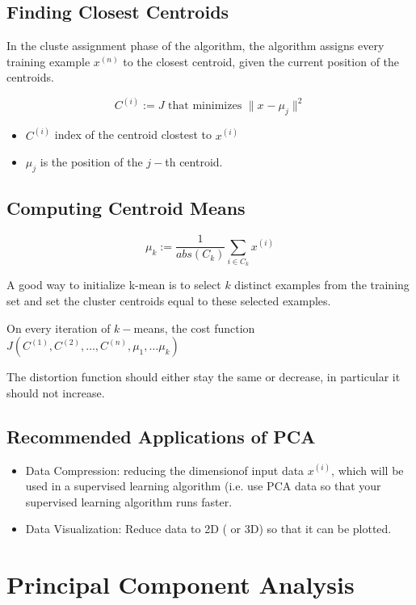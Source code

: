 \documentclass[11pt]{article} %
\begin{document}
\subsection*{Finding Closest Centroids}

In the cluste assignment phase of the algorithm, the algorithm assigns every training example $x^{(n)}$ to the closest 
centroid, given the current position of the centroids.

\[ C^{(i)} := J \mbox{ that minimizes } \| x^{} - \mu_j \| ^2 \]

\begin{itemize}
	\item $C^{(i)}$ index of the centroid clostest to $x^{(i)}$
	\item $\mu_j$ is the position of the $j-$th centroid.
\end{itemize}

\subsection{Computing Centroid Means}

\[ 
\mu_k := \frac{1}{abs(C_k)} \sum_{i \in C_k} x^{(i)}
\]

A good way to initialize k-mean is to select $k$ distinct examples from the training set and set the cluster centroids equal to these selected examples.

On every iteration of $k-$means, the cost function $J(C^{(1)},C^{(2)},\ldots, C^{(n)},
\mu_1,\ldots \mu_k)$

The distortion function should either stay the same or decrease, in particular it should not increase.

\subsection{Recommended Applications of PCA}

\begin{itemize}
	\item Data Compression: reducing the dimensionof input data $x^{(i)}$, which will be used in a supervised learning algorithm
	(i.e. use PCA data so that your supervised learning algorithm runs faster.
	
	\item Data Visualization: Reduce data to 2D ( or 3D) so that it can be plotted.
\end{itemize}

\section{Principal Component Analysis}
\end{document}
